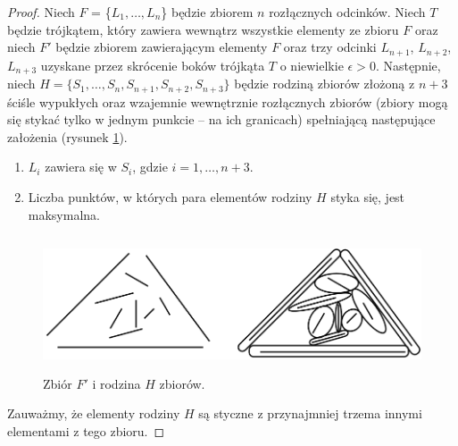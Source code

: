\documentclass[brudnopis]{xmgr}
\theoremstyle{definition}
\begin{document}
\begin{proof}
\indent Niech $F$ = \{$L_1, \ldots, L_n$\} będzie zbiorem $n$ rozłącznych odcinków. Niech $T$ będzie trójkątem, który zawiera wewnątrz wszystkie elementy ze zbioru $F$ oraz niech $F'$ będzie zbiorem zawierającym elementy $F$ oraz trzy odcinki $L_{n+1}$, $L_{n+2}$, $L_{n+3}$ uzyskane przez skrócenie boków trójkąta $T$ o niewielkie $\epsilon > 0$.
Następnie, niech $H = \{S_1,\ldots,S_n,S_{n+1},S_{n+2},S_{n+3}\}$ będzie rodziną zbiorów złożoną z $n + 3$ ściśle wypukłych oraz wzajemnie wewnętrznie rozłącznych zbiorów (zbiory mogą się stykać tylko w jednym punkcie -- na ich granicach) spełniającą następujące założenia (rysunek \ref{fig:zbior f rodzina h}).
\begin{enumerate}
  \item $L_i$ zawiera się w $S_i$, gdzie $i = 1,\ldots,n+3$.
  \item Liczba punktów, w których para elementów rodziny $H$ styka się, jest maksymalna.
\end{enumerate}
\begin{figure}[ht!]
 \centering
  \includegraphics[height=4cm, width=13.5cm]{rysunki/podswietlenie.png}
  \caption{Zbiór $F'$ i rodzina $H$ zbiorów.}
  \label{fig:zbior f rodzina h}
\end{figure} 
Zauważmy, że elementy rodziny $H$ są styczne z przynajmniej trzema innymi elementami z tego zbioru. 


\end{proof}
\end{document}
